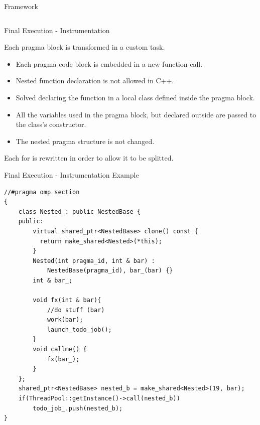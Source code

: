 \documentclass[xcolor=dvipsnames]{beamer}
\begin{document}
\begin{section}{Framework}
\begin{frame}{\hskip 0.3cm }
\begin{columns}
\begin{column}{4cm}
\end{column}
\end{columns}
\end{frame}






\begin{frame}{\hskip 0.3cm Final Execution - Instrumentation}

Each pragma block is transformed in a custom task.


\begin{itemize}

\item Each pragma code block is embedded in a new function call.

\item Nested function declaration is not allowed in C++.

\item Solved declaring the function in a local class defined inside the pragma block.

\item All the variables used in the pragma block, but declared outside are passed to the class's constructor.

\item The nested pragma structure is not changed.

\end{itemize}

Each for is rewritten in order to allow it to be splitted.



\end{frame}













\begin{frame}[fragile]{\hskip 0.3cm Final Execution - Instrumentation Example}

\begin{lstlisting}[language=CCC]
 //#pragma omp section
{
    class Nested : public NestedBase {
    public: 
        virtual shared_ptr<NestedBase> clone() const { 
          return make_shared<Nested>(*this); 
        } 
        Nested(int pragma_id, int & bar) : 
            NestedBase(pragma_id), bar_(bar) {}
        int & bar_;
            
        void fx(int & bar){   
            //do stuff (bar)
            work(bar);
            launch_todo_job(); 
        }
        void callme() {
            fx(bar_);
        }
    };
    shared_ptr<NestedBase> nested_b = make_shared<Nested>(19, bar);                             
    if(ThreadPool::getInstance()->call(nested_b)) 
        todo_job_.push(nested_b); 
}
\end{lstlisting}



\end{frame}
\end{section}
\end{document}
